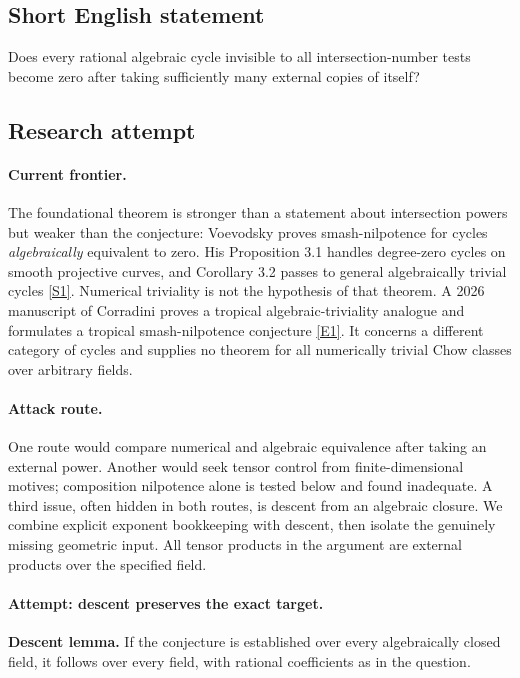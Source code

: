 \documentclass[11pt,a4paper]{article}
\newcommand{\sref}[2]{\hyperlink{source:#1:#2}{[S#2]}}
\newcommand{\eref}[2]{\hyperlink{extra:#1:#2}{[E#2]}}
\numberwithin{equation}{section}
\begin{document}
\subsection{Short English statement}
Does every rational algebraic cycle invisible to all intersection-number tests become zero after taking sufficiently many external copies of itself?
\subsection{Research attempt}

\paragraph{Current frontier.}
The foundational theorem is stronger than a statement about intersection
powers but weaker than the conjecture: Voevodsky proves smash-nilpotence
for cycles \emph{algebraically} equivalent to zero. His Proposition 3.1
handles degree-zero cycles on smooth projective curves, and Corollary 3.2
passes to general algebraically trivial cycles \sref{statement}{1}.
Numerical triviality is not the hypothesis of that theorem. A 2026
manuscript of Corradini proves a tropical algebraic-triviality analogue
and formulates a tropical smash-nilpotence conjecture \eref{statement}{1}.
It concerns a different category of cycles and supplies no theorem for
all numerically trivial Chow classes over arbitrary fields.

\paragraph{Attack route.}
One route would compare numerical and algebraic equivalence after taking
an external power. Another would seek tensor control from finite-dimensional
motives; composition nilpotence alone is tested below and found inadequate.
A third issue, often hidden in both routes, is descent from an algebraic
closure. We combine explicit exponent bookkeeping with descent, then
isolate the genuinely missing geometric input. All tensor products in the
argument are external products over the specified field.

\paragraph{Attempt: descent preserves the exact target.}
\textbf{Descent lemma.} If the conjecture is established over every
algebraically closed field, it follows over every field, with rational
coefficients as in the question.
\end{document}
